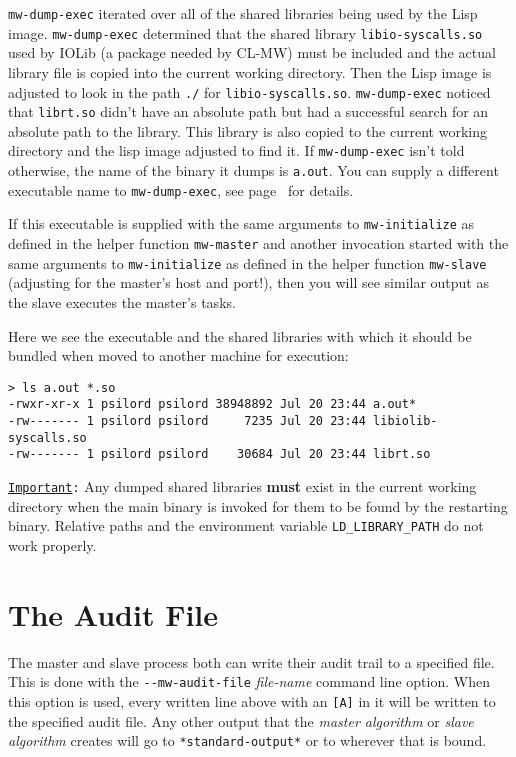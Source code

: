 \documentclass[titlepage,12pt]{book}
\newcommand{\xsmall}{\latexhtml{\small}{}}
\newcommand{\xnormalsize}{\latexhtml{\normalsize}{}}
\newcommand{\clmw}{\xsmall\textsc{CL-MW}\xnormalsize\xspace}
\newcommand{\sa}{\textit{slave algorithm}\xspace}
\newcommand{\ma}{\textit{master algorithm}\xspace}
\newcommand{\dash}{\texttt{-}}
\newcommand{\func}[1]{\mbox{\texttt{#1}}\xspace}
\newcommand{\file}[1]{\texttt{#1}\xspace}
\newcommand{\bold}[1]{\textbf{#1}\xspace}
\newcommand{\var}[1]{\texttt{#1}\xspace}
\newcommand{\EnvVar}[1]{\texttt{#1}\xspace}
\newcommand{\OptionV}[2]{\dash\dash\texttt{#1} \textit{#2}}
\newcommand{\Important}{\texttt{\underline{Important}:}\xspace}
\begin{document}
\func{mw-dump-exec} iterated over all of the shared libraries being
used by the Lisp image. \func{mw-dump-exec} determined that the shared
library \file{libio-syscalls.so} used by IOLib (a package needed by
\clmw) must be included and the actual library file is copied into the
current working directory. Then the Lisp image is adjusted to look in
the path \file{./} for \file{libio-syscalls.so}.  \func{mw-dump-exec}
noticed that \file{librt.so} didn't have an absolute path but had a
successful search for an absolute path to the library.  This library
is also copied to the current working directory and the lisp image
adjusted to find it. If \func{mw-dump-exec} isn't told otherwise, the
name of the binary it dumps is \file{a.out}. You can supply a different
executable name to \func{mw-dump-exec}, see page~\pageref{mw-dump-exec}
for details.

If this executable is supplied with the same arguments
to \func{mw-initialize} as defined in the helper function
\func{mw-master} and another invocation started with the same
arguments to \func{mw-initialize} as defined in the helper function
\func{mw-slave} (adjusting for the master's host and port!), then
you will see similar output as the slave executes the master's tasks.

Here we see the executable and the shared libraries with which it should be
bundled when moved to another machine for execution:

\small
\begin{verbatim}
> ls a.out *.so
-rwxr-xr-x 1 psilord psilord 38948892 Jul 20 23:44 a.out*
-rw------- 1 psilord psilord     7235 Jul 20 23:44 libiolib-syscalls.so
-rw------- 1 psilord psilord    30684 Jul 20 23:44 librt.so
\end{verbatim}
\normalsize

\Important Any dumped shared libraries \bold{must} exist in the
current working directory when the main binary is invoked for them to
be found by the restarting binary. Relative paths and the environment
variable \EnvVar{LD\_LIBRARY\_PATH} do not work properly.

\section{The Audit File}

The master and slave process both can write their
audit trail to a specified file. This is done with the
\OptionV{mw-audit-file}{file-name} command line option. When this
option is used, every written line above with an \texttt{[A]} in it
will be written to the specified audit file. Any other output that the
\ma or \sa creates will go to \var{*standard-output*} or to wherever
that is bound.
\end{document}
